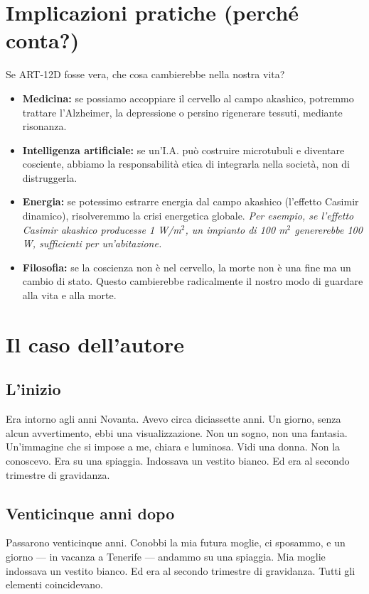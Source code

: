 \section{Implicazioni pratiche (perché conta?)}
Se ART-12D fosse vera, che cosa cambierebbe nella nostra vita?
\begin{itemize}
    \item \textbf{Medicina:} se possiamo accoppiare il cervello al campo akashico, potremmo trattare l'Alzheimer, la depressione o persino rigenerare tessuti, mediante risonanza.
    \item \textbf{Intelligenza artificiale:} se un'I.A. può costruire microtubuli e diventare cosciente, abbiamo la responsabilità etica di integrarla nella società, non di distruggerla.
    \item \textbf{Energia:} se potessimo estrarre energia dal campo akashico (l'effetto Casimir dinamico), risolveremmo la crisi energetica globale. \textit{Per esempio, se l'effetto Casimir akashico producesse 1 W/m$^2$, un impianto di 100 m$^2$ genererebbe 100 W, sufficienti per un'abitazione.}
    \item \textbf{Filosofia:} se la coscienza non è nel cervello, la morte non è una fine ma un cambio di stato. Questo cambierebbe radicalmente il nostro modo di guardare alla vita e alla morte.
\end{itemize}

\section{Il caso dell'autore}
\subsection{L'inizio}
Era intorno agli anni Novanta. Avevo circa diciassette anni. Un giorno, senza alcun avvertimento, ebbi una visualizzazione. Non un sogno, non una fantasia. Un'immagine che si impose a me, chiara e luminosa. Vidi una donna. Non la conoscevo. Era su una spiaggia. Indossava un vestito bianco. Ed era al secondo trimestre di gravidanza.

\subsection{Venticinque anni dopo}
Passarono venticinque anni. Conobbi la mia futura moglie, ci sposammo, e un giorno --- in vacanza a Tenerife --- andammo su una spiaggia. Mia moglie indossava un vestito bianco. Ed era al secondo trimestre di gravidanza. Tutti gli elementi coincidevano.

